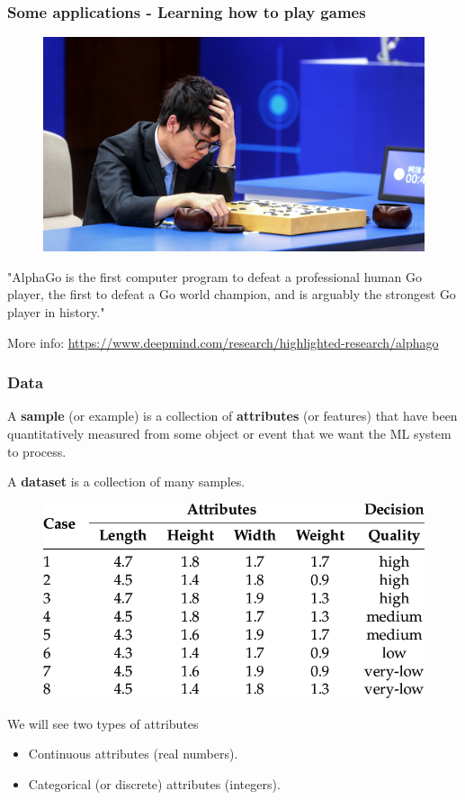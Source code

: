 \documentclass{beamer}
\begin{document}
	\begin{frame}
		\frametitle{Some applications - Learning how to play games}
		\begin{figure}
			\centering
			\includegraphics[scale=0.3]{images/alphago}
		\end{figure}
	"AlphaGo is the first computer program to defeat a professional human Go player, the first to defeat a Go world champion, and is arguably the strongest Go player in history." 
	
	More info: \href{https://www.deepmind.com/research/highlighted-research/alphago}{https://www.deepmind.com/research/highlighted-research/alphago}
	\end{frame}

	\begin{frame}
		\frametitle{Data}
		A \textbf{sample} (or example) is a collection of \textbf{attributes} (or features) that have been quantitatively measured from some object or event that we want the ML system to process.
		
		\vspace{5mm}
		
		
		A \textbf{dataset} is a collection of many samples.
		
		\begin{figure}
			\centering
			\includegraphics[scale=0.25]{images/data-example}
		\end{figure}
		
		
		We will see two types of attributes
		
		
		\begin{itemize}
			\item Continuous attributes (real numbers).
			\item Categorical (or discrete) attributes (integers). 
		\end{itemize}
	\end{frame}
\end{document}
